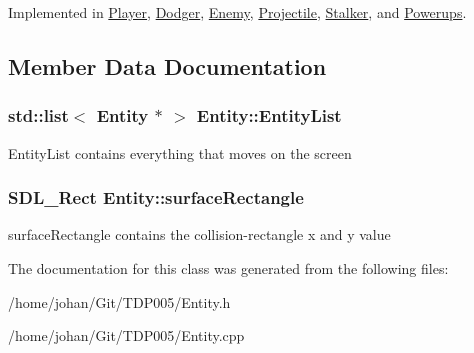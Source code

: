 \-Implemented in \hyperlink{class_player_ae02ee46d8c20dd0697b975f935b09839}{\-Player}, \hyperlink{class_dodger_ae9fa20d61b2e80b53ea0727586745349}{\-Dodger}, \hyperlink{class_enemy_a1c208ac4a80b892f9692222bcb96f6ae}{\-Enemy}, \hyperlink{class_projectile_ac5f6d2a73c1f82f2f11ae353d251acef}{\-Projectile}, \hyperlink{class_stalker_a0b9395ff4779bcad95710040866d2649}{\-Stalker}, and \hyperlink{class_powerups_ada26544ace2dfe109fea81b7792a8435}{\-Powerups}.



\subsection{\-Member \-Data \-Documentation}
\hypertarget{class_entity_a465ab51717b7f85469608f5213dfe13c}{
\subsubsection[{\-Entity\-List}]{\setlength{\rightskip}{0pt plus 5cm}std\-::list$<$ {\bf \-Entity} $\ast$ $>$ {\bf \-Entity\-::\-Entity\-List}}}\label{class_entity_a465ab51717b7f85469608f5213dfe13c}
\-Entity\-List contains everything that moves on the screen \hypertarget{class_entity_ae1866f99a31f291b023356d8ababfa12}{
\subsubsection[{surface\-Rectangle}]{\setlength{\rightskip}{0pt plus 5cm}\-S\-D\-L\-\_\-\-Rect {\bf \-Entity\-::surface\-Rectangle}}}\label{class_entity_ae1866f99a31f291b023356d8ababfa12}
surface\-Rectangle contains the collision-\/rectangle x and y value 

\-The documentation for this class was generated from the following files\-:\begin{DoxyCompactItemize}
\item 
/home/johan/\-Git/\-T\-D\-P005/\-Entity.\-h\item 
/home/johan/\-Git/\-T\-D\-P005/\-Entity.\-cpp\end{DoxyCompactItemize}
